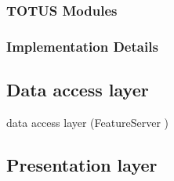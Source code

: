 \subsubsection*{TOTUS Modules}

\subsubsection*{Implementation Details}

\subsection{Data access layer}
data access layer (FeatureServer\cite{dummy_temp} )
\subsection{Presentation layer}